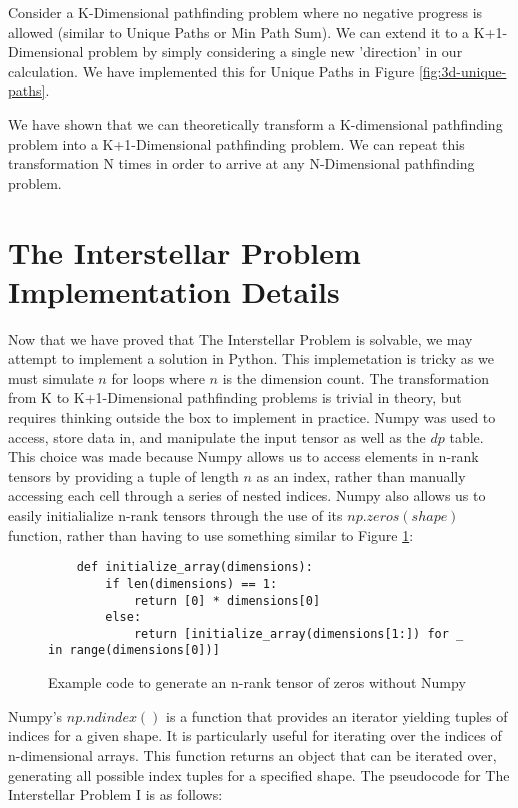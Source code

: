 Consider a K-Dimensional pathfinding problem where no negative progress is allowed (similar to Unique Paths or Min Path Sum).
We can extend it to a K+1-Dimensional problem by simply considering a single new 'direction' in our calculation.
We have implemented this for Unique Paths in Figure \ref{fig:3d-unique-paths}.

We have shown that we can theoretically transform a K-dimensional pathfinding problem into a K+1-Dimensional pathfinding problem.
We can repeat this transformation N times in order to arrive at any N-Dimensional pathfinding problem.



\section{The Interstellar Problem Implementation Details}
Now that we have proved that The Interstellar Problem is solvable, we may attempt to implement a solution in Python.
This implemetation is tricky as we must simulate $n$ for loops where $n$ is the dimension count. The transformation from K to K+1-Dimensional pathfinding problems is trivial in theory, but requires thinking outside the box to implement in practice.
Numpy was used to 
access, store data in, and manipulate the input tensor as well as the $dp$ table.
This choice was made because Numpy allows us to access elements in n-rank tensors by providing a tuple of length $n$ as an index, rather than manually accessing each cell through a series of nested indices.
Numpy also allows us to easily initialialize n-rank tensors through the use of its $np.zeros(shape)$ function, rather than having to use something similar to Figure \ref{fig:zeros}:

\begin{figure}[H]
    \centering
    \begin{lstlisting}
    def initialize_array(dimensions):
        if len(dimensions) == 1:
            return [0] * dimensions[0]
        else:
            return [initialize_array(dimensions[1:]) for _ in range(dimensions[0])]
    \end{lstlisting}
    \caption{Example code to generate an n-rank tensor of zeros without Numpy}
    \label{fig:zeros}
\end{figure}

Numpy's $np.ndindex()$ is a function that provides an iterator yielding tuples of indices for a given shape.
It is particularly useful for iterating over the indices of n-dimensional arrays.
This function returns an object that can be iterated over, generating all possible index tuples for a specified shape.
\newpage
The pseudocode for The Interstellar Problem I is as follows:

